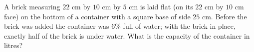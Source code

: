 A brick measuring $22$ cm by $10$ cm by $5$ cm is laid flat (on its $22$ cm by $10$ cm face) on the bottom of a container with a square base of side $25$ cm. Before the brick was added the container was $6\%$ full of water; with the brick in place, exactly half of the brick is under water. What is the capacity of the container in litres?
